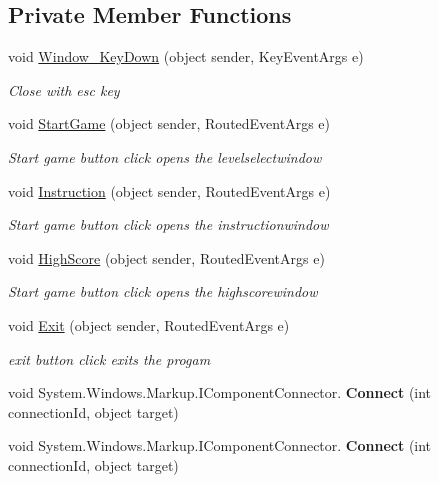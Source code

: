 \subsection*{Private Member Functions}
\begin{DoxyCompactItemize}
\item 
void \mbox{\hyperlink{class_bomberman_1_1_u_i_1_1_main_window_ab27d22db9ad5bd124440639fba904369}{Window\+\_\+\+Key\+Down}} (object sender, Key\+Event\+Args e)
\begin{DoxyCompactList}\small\item\em Close with esc key \end{DoxyCompactList}\item 
void \mbox{\hyperlink{class_bomberman_1_1_u_i_1_1_main_window_abc549365947e1eb5b45eb21d059b585b}{Start\+Game}} (object sender, Routed\+Event\+Args e)
\begin{DoxyCompactList}\small\item\em Start game button click opens the levelselectwindow \end{DoxyCompactList}\item 
void \mbox{\hyperlink{class_bomberman_1_1_u_i_1_1_main_window_a4bce805a05bd09f806ee58df8ff17ac8}{Instruction}} (object sender, Routed\+Event\+Args e)
\begin{DoxyCompactList}\small\item\em Start game button click opens the instructionwindow \end{DoxyCompactList}\item 
void \mbox{\hyperlink{class_bomberman_1_1_u_i_1_1_main_window_ae607495bbefafe350391c5c39dcdba21}{High\+Score}} (object sender, Routed\+Event\+Args e)
\begin{DoxyCompactList}\small\item\em Start game button click opens the highscorewindow \end{DoxyCompactList}\item 
void \mbox{\hyperlink{class_bomberman_1_1_u_i_1_1_main_window_a0e29abcc661e72b3792ec8713aea4ee3}{Exit}} (object sender, Routed\+Event\+Args e)
\begin{DoxyCompactList}\small\item\em exit button click exits the progam \end{DoxyCompactList}\item 
\mbox{\label{class_bomberman_1_1_u_i_1_1_main_window_a05b602e88e3b830643087360b9f7ec51}} 
void System.\+Windows.\+Markup.\+I\+Component\+Connector. {\bfseries Connect} (int connection\+Id, object target)
\item 
\mbox{\label{class_bomberman_1_1_u_i_1_1_main_window_a05b602e88e3b830643087360b9f7ec51}} 
void System.\+Windows.\+Markup.\+I\+Component\+Connector. {\bfseries Connect} (int connection\+Id, object target)
\end{DoxyCompactItemize}
